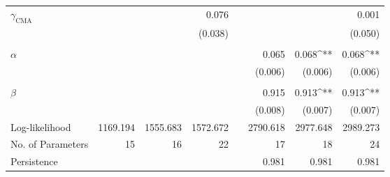 \begin{table}[!ht]
\begin{tabularx}{\textwidth}{@{}l ddd X ddd @{}}
    \\
    $\gamma_\text{CMA}$ & & & 0.076 && & & 0.001 \\
    & & & (0.038) && & & (0.050) \\
    \\
    $\alpha$ & & & && 0.065 & 0.068^{**} & 0.068^{**} \\
    & & & && (0.006) & (0.006) & (0.006) \\
    \\
    $\beta$ & & & && 0.915 & 0.913^{**} & 0.913^{**} \\
    & & & && (0.008) & (0.007) & (0.007) \\
    \midrule
    Log-likelihood & 1169.194 & 1555.683 & 1572.672 && 2790.618 & 2977.648 & 2989.273 \\
    No. of Parameters & 15 & 16 & 22 && 17 & 18 & 24 \\
    Persistence & & & && 0.981 & 0.981 & 0.981 \\
    \bottomrule
  \end{tabularx}

  \label{tab:copula_estimation}
\end{table}
